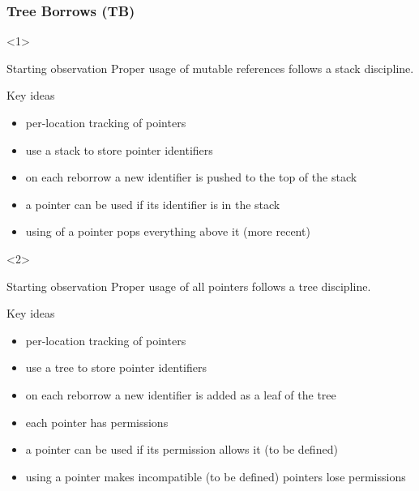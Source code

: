 \begin{frame}[t]
    \frametitle{ Tree Borrows (TB)}
    \begin{onlyenv}<1>
        \begin{block}{Starting observation}
            Proper usage of mutable references follows a stack discipline.
        \end{block}
        \begin{block}{Key ideas}
            \begin{itemize}
                \item per-location tracking of pointers
                \item use a stack to store pointer identifiers
                \item on each reborrow a new identifier is pushed to the top of the stack
                \item a pointer can be used if its identifier is in the stack
                \item using of a pointer pops everything above it (more recent)
            \end{itemize}
        \end{block}
    \end{onlyenv}

    \begin{onlyenv}<2>
        \begin{block}{Starting observation}
            Proper usage of {\color{red}all pointers} follows a {\color{red}tree} discipline.
        \end{block}
        \begin{block}{Key ideas}
            \begin{itemize}
                \item per-location tracking of pointers
                \item use a {\color{red}tree} to store pointer identifiers
                \item on each reborrow a new identifier is {\color{red}added as a leaf of the tree}
                \item {\color{red}each pointer has permissions}
                \item a pointer can be used {\color{red}if its permission allows it (to be defined)}
                \item using a pointer {\color{red}makes incompatible (to be defined) pointers lose permissions}
            \end{itemize}
        \end{block}
    \end{onlyenv}
\end{frame}

